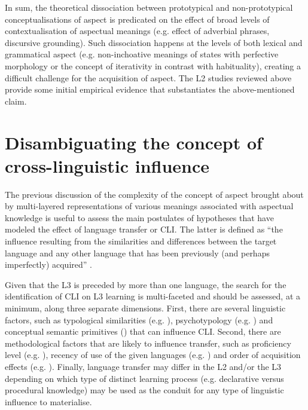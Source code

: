 \documentclass[output=paper,modfonts,nonflat,newtxmath]{langsci/langscibook}
\begin{document}
In sum, the theoretical dissociation between prototypical and non-prototypical conceptualisations of aspect is predicated on the effect of broad levels of contextualisation of aspectual meanings (e.g. effect of adverbial phrases, discursive grounding). Such dissociation happens at the levels of both lexical and grammatical aspect (e.g. non-inchoative meanings of states with perfective morphology or the concept of iterativity in contrast with habituality), creating a difficult challenge for the acquisition of aspect. The L2 studies reviewed above provide some initial empirical evidence that substantiates the above-mentioned claim.

\section{{Disambiguating} {the} {concept} {of} {cross-linguistic} {influence}} %
\label{sec:salaberry:2}

The previous discussion of the complexity of the concept of aspect brought about by multi-layered representations of various meanings associated with aspectual knowledge is useful to assess the main postulates of hypotheses that have modeled the effect of language transfer or CLI. The latter is defined as “the influence resulting from the similarities and differences between the target language and any other language that has been previously (and perhaps imperfectly) acquired” \citep[27]{Odlin1989}.

Given that the L3 is preceded by more than one language, the search for the identification of CLI on L3 learning is multi-faceted \citet{DeAngelis2007} and should be assessed, at a minimum, along three separate dimensions. First, there are several linguistic factors, such as typological similarities (e.g. \citealt{Rothman2011, Rothman2015, WestergaardEtAl2017}), psychotypology (e.g. \citealt{Kellerman1983, BardelLindqvist2007}) and conceptual semantic primitives (\citealt{BermanSlobin1994, Slobin1996, BerkesFlynn2012}) that can influence CLI. Second, there are methodological factors that are likely to influence transfer, such as proficiency level (e.g. \citealt{Dewaele2001, DeAngelis2007, Lindqvist2010}), recency of use of the given languages (e.g. \citealt{WilliamsHammarberg1998}) and order of acquisition effects (e.g. \citealt{Dewaele1998, WilliamsHammarberg1998}). Finally, language transfer may differ in the L2 and/or the L3 depending on which type of distinct learning process (e.g. declarative versus procedural knowledge) may be used as the conduit for any type of linguistic influence to materialise.
\end{document}
